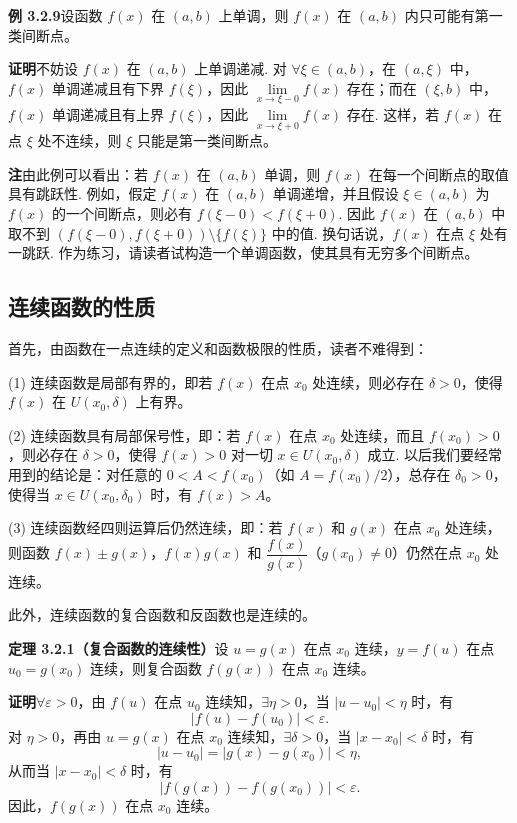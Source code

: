 \documentclass[UTF8, 12pt, fontset=fandol, oneside]{ctexart}
\begin{document}
\noindent\textbf{例 3.2.9}\quad 设函数 $f(x)$ 在 $(a,b)$ 上单调，则 $f(x)$ 在 $(a,b)$ 内只可能有第一类间断点。

\noindent\textbf{证明}\quad 不妨设 $f(x)$ 在 $(a,b)$ 上单调递减. 对 $\forall\xi\in(a,b)$，在 $(a,\xi)$ 中，$f(x)$ 单调递减且有下界 $f(\xi)$，因此 $\lim\limits_{x\to\xi-0}f(x)$ 存在；而在 $(\xi,b)$ 中，$f(x)$ 单调递减且有上界 $f(\xi)$，因此 $\lim\limits_{x\to\xi+0}f(x)$ 存在. 这样，若 $f(x)$ 在点 $\xi$ 处不连续，则 $\xi$ 只能是第一类间断点。

\noindent\textbf{注}\quad 由此例可以看出：若 $f(x)$ 在 $(a,b)$ 单调，则 $f(x)$ 在每一个间断点的取值具有跳跃性. 例如，假定 $f(x)$ 在 $(a,b)$ 单调递增，并且假设 $\xi\in(a,b)$ 为 $f(x)$ 的一个间断点，则必有 $f(\xi-0)<f(\xi+0)$. 因此 $f(x)$ 在 $(a,b)$ 中取不到 $(f(\xi-0),f(\xi+0))\setminus\{f(\xi)\}$ 中的值. 换句话说，$f(x)$ 在点 $\xi$ 处有一跳跃. 作为练习，请读者试构造一个单调函数，使其具有无穷多个间断点。

\subsection{连续函数的性质}

首先，由函数在一点连续的定义和函数极限的性质，读者不难得到：

(1) 连续函数是局部有界的，即若 $f(x)$ 在点 $x_0$ 处连续，则必存在 $\delta>0$，使得 $f(x)$ 在 $U(x_0,\delta)$ 上有界。

(2) 连续函数具有局部保号性，即：若 $f(x)$ 在点 $x_0$ 处连续，而且 $f(x_0)>0$，则必存在 $\delta>0$，使得 $f(x)>0$ 对一切 $x\in U(x_0,\delta)$ 成立. 以后我们要经常用到的结论是：对任意的 $0<A<f(x_0)$（如 $A=f(x_0)/2$），总存在 $\delta_0>0$，使得当 $x\in U(x_0,\delta_0)$ 时，有 $f(x)>A$。

(3) 连续函数经四则运算后仍然连续，即：若 $f(x)$ 和 $g(x)$ 在点 $x_0$ 处连续，则函数 $f(x)\pm g(x)$，$f(x)g(x)$ 和 $\dfrac{f(x)}{g(x)}$（$g(x_0)\ne0$）仍然在点 $x_0$ 处连续。

此外，连续函数的复合函数和反函数也是连续的。

\noindent\textbf{定理 3.2.1（复合函数的连续性）}\quad 设 $u=g(x)$ 在点 $x_0$ 连续，$y=f(u)$ 在点 $u_0=g(x_0)$ 连续，则复合函数 $f(g(x))$ 在点 $x_0$ 连续。

\noindent\textbf{证明}\quad $\forall\varepsilon>0$，由 $f(u)$ 在点 $u_0$ 连续知，$\exists\eta>0$，当 $|u-u_0|<\eta$ 时，有
\[
  |f(u)-f(u_0)|<\varepsilon.
\]
对 $\eta>0$，再由 $u=g(x)$ 在点 $x_0$ 连续知，$\exists\delta>0$，当 $|x-x_0|<\delta$ 时，有
\[
  |u-u_0|=|g(x)-g(x_0)|<\eta,
\]
从而当 $|x-x_0|<\delta$ 时，有
\[
  |f(g(x))-f(g(x_0))|<\varepsilon.
\]
因此，$f(g(x))$ 在点 $x_0$ 连续。
\end{document}
